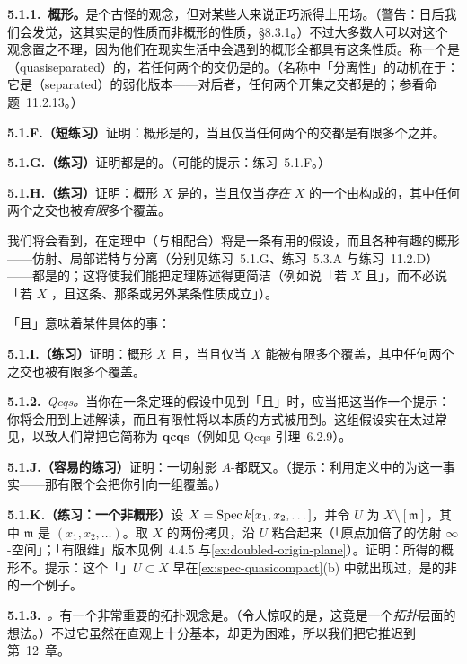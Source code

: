 \textbf{5.1.1.\ \trQuasiSeparated{}概形。}\quad \trQuasiseparatedness{}是个古怪的观念，但对某些人来说正巧派得上用场。（警告：日后我们会发觉，这其实是\emph{\trMorphism}的性质而非概形的性质，\S8.3.1。）不过大多数人可以对这个观念置之不理，因为他们在现实生活中会遇到的概形全都具有这条性质。称一个\trTopologicalSpace{}是\textbf{\trQuasiSeparated}（quasiseparated）的，若任何两个\trQuasicompact{}\trOpenSubset{}的交仍是\trQuasicompact{}的。（名称中「分离性」的动机在于：它是\emph{\trSeparated}（separated）的弱化版本——对后者，任何两个\emph{\trAffine}开集之交都是\trAffine{}的；参看命题~11.2.13。）

\textbf{5.1.F.（短练习）}\quad 证明：概形是\trQuasiSeparated{}的，当且仅当任何两个\trAffine\trOpenSubscheme{}的交都是有限多个\trAffine\trOpenSubscheme{}之并。

\textbf{5.1.G.（练习）}\quad 证明\trAffineScheme{}都是\trQuasiSeparated{}的。（可能的提示：练习~5.1.F。）

\textbf{5.1.H.（练习）}\quad 证明：概形 $X$ 是\trQuasiSeparated{}的，当且仅当\emph{存在} $X$ 的一个由\trAffine\trOpenSubscheme{}构成的\trCover，其中任何两个之交也被\emph{有限}多个\trAffine\trOpenSubscheme{}覆盖。

我们将会看到，\trQuasiseparatedness{}在定理中（与\trQuasicompactness{}相配合）将是一条有用的假设，而且各种有趣的概形——仿射、局部诺特与分离（分别见练习~5.1.G、练习~5.3.A 与练习~11.2.D）——都是\trQuasiSeparated{}的；这将使我们能把定理陈述得更简洁（例如说「若 $X$ \trQuasicompact{}且\trQuasiSeparated」，而不必说「若 $X$ \trQuasicompact，且这条、那条或另外某条性质成立」）。

「\trQuasicompact{}且\trQuasiSeparated」意味着某件具体的事：

\textbf{5.1.I.（练习）}\quad 证明：概形 $X$ \trQuasicompact{}且\trQuasiSeparated{}，当且仅当 $X$ 能被有限多个\trAffine\trOpenSubscheme{}覆盖，其中任何两个之交也被有限多个\trAffine\trOpenSubscheme{}覆盖。

\textbf{5.1.2.}\ \emph{Qcqs。}\quad 当你在一条定理的假设中见到「\trQuasicompact{}且\trQuasiSeparated」时，应当把这当作一个提示：你将会用到上述解读，而且有限性将以本质的方式被用到。这组假设实在太过常见，以致人们常把它简称为 \textbf{qcqs}（例如见 Qcqs 引理~6.2.9）。

\textbf{5.1.J.（容易的练习）}\quad 证明：一切射影 $A$-\trScheme{}都既\trQuasicompact{}又\trQuasiSeparated。（提示：利用定义中的\trGradedRing{}为\trFinitelyGenerated{}这一事实——那有限个\trGenerator{}会把你引向一组覆盖。）

\textbf{5.1.K.（练习：一个非\trQuasiSeparated{}概形）}\quad 设 $X=\operatorname{Spec} k[x_1,x_2,\dots]$，并令 $U$ 为 $X\setminus[\mathfrak{m}]$，其中 $\mathfrak{m}$ 是\trMaximalIdeal{} $(x_1,x_2,\dots)$。取 $X$ 的两份拷贝，沿 $U$ 粘合起来（「原点加倍了的仿射 $\infty$-空间」；「有限维」版本见例~4.4.5 与\cref{ex:doubled-origin-plane}）。证明：所得的概形不\trQuasiSeparated。提示：这个「\trOpenEmbedding」$U\subset X$ 早在\cref{ex:spec-quasicompact}(b) 中就出现过，是\trAffineScheme{}的非\trQuasicompact{}\trOpenSubset{}的一个例子。

\textbf{5.1.3.}\ \emph{\trDimension{}。}\quad 有一个非常重要的拓扑观念是\emph{\trDimension}。（令人惊叹的是，这竟是一个\emph{拓扑}层面的想法。）不过它虽然在直观上十分基本，却更为困难，所以我们把它推迟到第~12~章。
